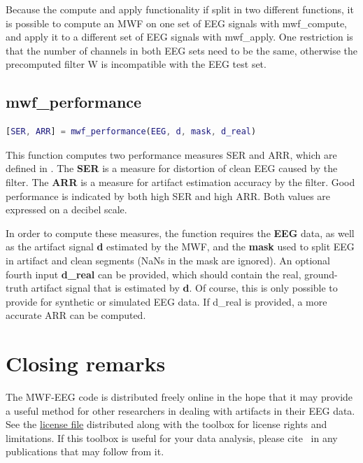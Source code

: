 \documentclass[11pt]{article}
\begin{document}
Because the compute and apply functionality if split in two different functions, it is possible to compute an MWF on one set of EEG signals with mwf\_compute, and apply it to a different set of EEG signals with mwf\_apply. One restriction is that the number of channels in both EEG sets need to be the same, otherwise the precomputed filter W is incompatible with the EEG test set.

\subsection{mwf\_performance}

\begin{lstlisting}[frame=single, language=matlab]
[SER, ARR] = mwf_performance(EEG, d, mask, d_real)
\end{lstlisting}

This function computes two performance measures SER and ARR, which are defined in \cite{somers2018generic}. The \textbf{SER} is a measure for distortion of clean EEG caused by the filter. The \textbf{ARR} is a measure for artifact estimation accuracy by the filter. Good performance is indicated by both high SER and high ARR. Both values are expressed on a decibel scale.

In order to compute these measures, the function requires the \textbf{EEG} data, as well as the artifact signal \textbf{d} estimated by the MWF, and the \textbf{mask} used to split EEG in artifact and clean segments (NaNs in the mask are ignored). An optional fourth input \textbf{d\_real} can be provided, which should contain the real, ground-truth artifact signal that is estimated by \textbf{d}. Of course, this is only possible to provide for synthetic or simulated EEG data. If d\_real is provided, a more accurate ARR can be computed.

\newpage
\section{Closing remarks}

The MWF-EEG code is distributed freely online in the hope that it may provide a useful method for other researchers in dealing with artifacts in their EEG data. See the \href{www.github.com/exporl/mwf-artifact-removal/blob/master/LICENSE.md}{license file} distributed along with the toolbox for license rights and limitations. If this toolbox is useful for your data analysis, please cite~ \cite{somers2018generic} in any publications that may follow from it.
\end{document}
